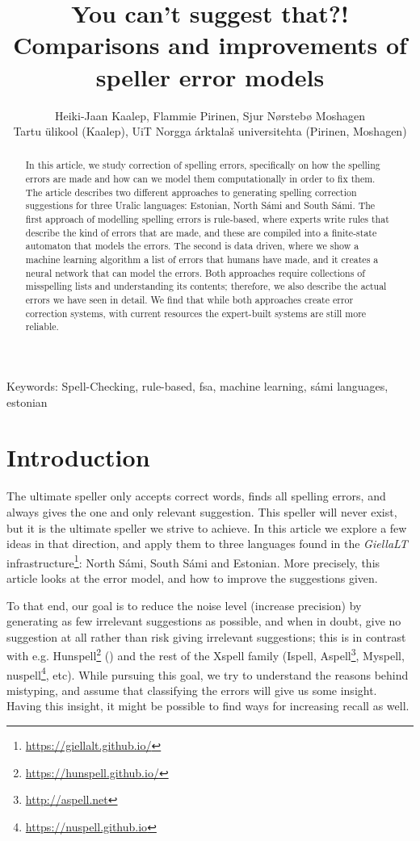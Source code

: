 \documentclass{flammie}
\title{You can't suggest that?! \\ Comparisons and improvements of speller error
models}
\author{Heiki-Jaan Kaalep, Flammie Pirinen, Sjur Nørstebø Moshagen\\
Tartu ülikool (Kaalep), UiT Norgga árktalaš universitehta (Pirinen, Moshagen)}
\providecommand{\keywords}[1]
{
  \small
  Keywords: #1
}
\begin{document}
\setcounter{page}{125}

\maketitle

\begin{abstract}
\noindent
In this article, we study correction of spelling errors, specifically on how the
    spelling errors are made and how can we model them computationally in order
    to fix them.  The article describes two different approaches to generating
    spelling correction suggestions for three Uralic languages: Estonian, North
    Sámi and South Sámi.  The first approach of modelling spelling errors is
    rule-based, where experts write rules that describe the kind of errors that
    are made, and these are compiled into a finite-state automaton that models
    the errors.  The second is data driven, where we show a machine learning
    algorithm a list of errors that humans have made, and it creates a neural
    network that can model the errors.  Both approaches require collections of
    misspelling lists and understanding its contents; therefore, we also
    describe the actual errors we have seen in detail.  We find that while both
    approaches create error correction systems, with current resources the
    expert-built systems are still more reliable.
\end{abstract}

\keywords{Spell-Checking, rule-based, fsa, machine learning, sámi languages, estonian}

\section[Introduction]{Introduction}

The ultimate speller only accepts correct words, finds all spelling errors, and
always gives the one and only relevant suggestion. This speller will never
exist, but it is the ultimate speller we strive to achieve. In this article we
explore a few ideas in that direction, and apply them to three languages found
in the \textit{GiellaLT}
infrastructure\footnote{\url{https://giellalt.github.io/}}: North Sámi, South
Sámi and Estonian. More precisely, this article looks at the error model, and
how to improve the suggestions given.

To that end, our goal is to reduce the noise level (increase precision) by
generating as few irrelevant suggestions as possible, and when in doubt, give no
suggestion at all rather than risk giving irrelevant suggestions; this is in
contrast with e.g. Hunspell\footnote{\url{https://hunspell.github.io/}}
(\cite{tron2005hunmorph}) and the rest of the Xspell family (Ispell,
Aspell\footnote{\url{http://aspell.net}}, Myspell,
nuspell\footnote{\url{https://nuspell.github.io}}, etc). While pursuing this
goal, we try to understand the reasons behind mistyping, and assume that
classifying the errors will give us some insight. Having this insight, it might
be possible to find ways for increasing recall as well.
\end{document}
